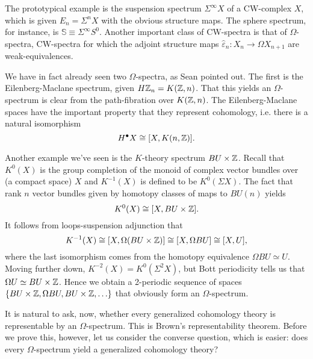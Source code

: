 \documentclass{amsart}
\begin{document}
The prototypical example is the suspension spectrum $\Sigma^\infty X$ of a CW-complex $X$, which is given
$E_n = \Sigma^n X$ with the obvious structure maps. The sphere spectrum, for instance, is $\mathbb{S}\equiv\Sigma^\infty S^0$.
Another important class of CW-spectra is that of $\Omega$-spectra, CW-spectra for which the adjoint structure
maps $\hat\varepsilon_n: X_n\to \Omega X_{n+1}$ are weak-equivalences.

We have in fact already seen two $\Omega$-spectra, as Sean pointed out. The first is the Eilenberg-Maclane spectrum,
given $H\mathbb{Z}_n=K(\mathbb{Z},n)$. That this yields an $\Omega$-spectrum is clear from the path-fibration over $K(\mathbb{Z},n)$.
The Eilenberg-Maclane spaces have the important property that they represent cohomology, i.e. there is a natural
isomorphism
\begin{equation*}
    H^\bullet X \cong [X, K(n,\mathbb{Z})].
\end{equation*}

Another example we've seen is the $K$-theory spectrum $BU\times\mathbb{Z}$. Recall that $K^0(X)$ is the group completion of
the monoid of complex vector bundles over (a compact space) $X$ and $K^{-1}(X)$ is defined to be $K^0(\Sigma X)$.
The fact that rank $n$ vector bundles given by homotopy classes of maps to $BU(n)$ yields
\begin{equation*}
    K^0(X) \cong [X, BU\times\mathbb{Z}].
\end{equation*}
It follows from loops-suspension adjunction that
\begin{equation*}
    K^{-1}(X) \cong [X, \Omega(BU\times \mathbb{Z})] \cong [X, \Omega BU]\cong [X, U],
\end{equation*}
where the last isomorphism comes from the homotopy equivalence $\Omega BU\simeq U$.
Moving further down, $K^{-2}(X)=K^0(\Sigma^2X)$, but Bott periodicity tells us that $\Omega U\simeq BU\times\mathbb{Z}$.
Hence we obtain a 2-periodic sequence of spaces $\{BU\times\mathbb{Z}, \Omega BU,BU\times\mathbb{Z},\ldots\}$ that obviously form an
$\Omega$-spectrum.

It is natural to ask, now, whether every generalized cohomology theory is representable by an $\Omega$-spectrum.
This is Brown's representability theorem. Before we prove this, however, let us consider the converse question, which
is easier: does every $\Omega$-spectrum yield a generalized cohomology theory?
\end{document}
